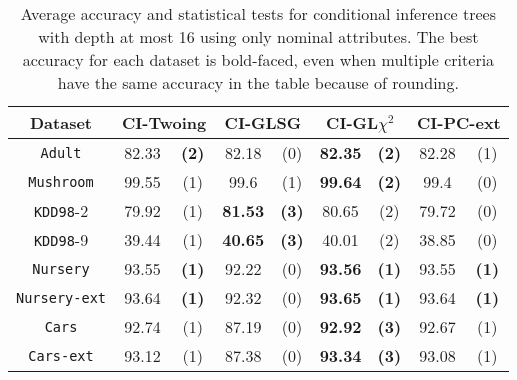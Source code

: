     \begin{table}
    \small
      \centering
        \caption{Average accuracy and statistical tests  for  conditional inference trees 
with depth at most 16 using only nominal attributes. The best accuracy for each dataset is bold-faced, even when multiple criteria have the same accuracy in the table because of rounding.}

\begin{tabular}{c|cc|cc|cc|cc} 
Dataset             & \multicolumn{2}{c|}{CI-Twoing} &   \multicolumn{2}{c|}{CI-GLSG} & \multicolumn{2}{c|}{CI-GL$\chi^2$} & \multicolumn{2}{c}{CI-PC-ext}\\  \hline   
{\tt Adult}         & 82.33      &  {\bf (2)}        &   82.18      & (0)             & {\bf 82.35} &  {\bf (2)}           & 82.28       & (1)            \\
{\tt Mushroom}      & 99.55      &  (1)              &   99.6       & (1)             & {\bf 99.64} &  {\bf (2)}           & 99.4        & (0)            \\
{\tt KDD98}-2       & 79.92      &  (1)              &  {\bf 81.53} & {\bf (3)}       &  80.65      &  (2)                 & 79.72       & (0)            \\
{\tt KDD98}-9       & 39.44      &  (1)              &  {\bf 40.65} & {\bf (3)}       &  40.01      &  (2)                 & 38.85       & (0)            \\
{\tt Nursery}       & 93.55      &  {\bf (1)}        &   92.22      & (0)             & {\bf 93.56} &  {\bf (1)}           & 93.55       & {\bf (1)}      \\
{\tt Nursery-ext}   & 93.64      &  {\bf (1)}        &   92.32      & (0)             & {\bf 93.65} &  {\bf (1)}           & 93.64       & {\bf (1)}      \\
{\tt Cars}          & 92.74      &  (1)              &   87.19      & (0)             & {\bf 92.92} &  {\bf (3)}           & 92.67       & (1)            \\
{\tt Cars-ext}      & 93.12      &  (1)              &   87.38      & (0)             & {\bf 93.34} &  {\bf (3)}           & 93.08       & (1)            \\

\end{tabular}
\end{table}
